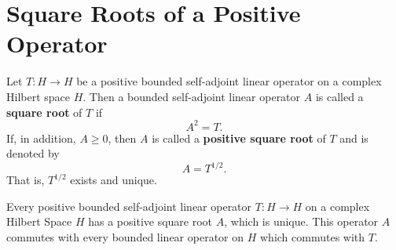 \section{Square Roots of a Positive Operator}

\begin{theorem}
    Let \( T: H \to H  \) be a positive bounded self-adjoint linear operator on a complex Hilbert space \( H  \). Then a bounded self-adjoint linear operator \( A  \) is called a \textbf{square root} of \( T  \) if  
    \[  A^{2} = T.  \]
    If, in addition, \( A \geq 0  \), then \( A  \) is called a \textbf{positive square root} of \( T  \) and is denoted by
    \[  A = T^{1/2}. \]
    That is, \( T^{1/2}  \) exists and unique.
\end{theorem}

\begin{theorem}\label{9.4-2}
Every positive bounded self-adjoint linear operator \( T: H \to H  \) on a complex Hilbert Space \( H  \) has a positive square root \( A  \), which is unique. This operator \( A  \) commutes with every bounded linear operator on \( H  \) which commutes with \( T  \).    
\end{theorem}
